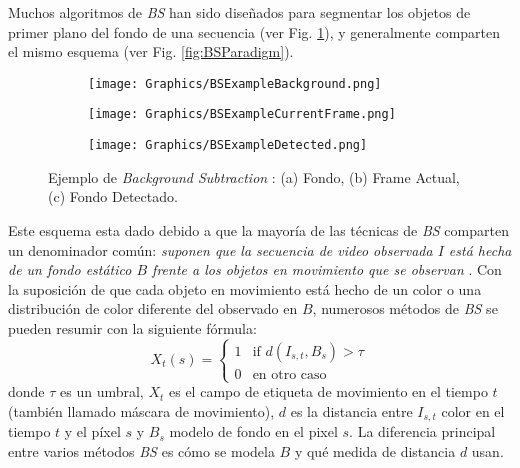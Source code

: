 Muchos algoritmos de \textit{BS} han sido diseñados para segmentar los objetos de primer plano del fondo de una secuencia (ver Fig. \ref{fig:BSExample}), y generalmente comparten el mismo esquema (ver Fig. \ref{fig:BSParadigm}).

\begin{figure}[h!]
	\centering
	\begin{subfigure}[b]{0.32\linewidth}
		\centering
		\texttt{[image: Graphics/BSExampleBackground.png]}
		\caption{}
	\end{subfigure}
	\begin{subfigure}[b]{0.32\linewidth}
		\centering
		\texttt{[image: Graphics/BSExampleCurrentFrame.png]}
		\caption{}
	\end{subfigure}
	\begin{subfigure}[b]{0.32\linewidth}
		\centering
		\texttt{[image: Graphics/BSExampleDetected.png]}
		\caption{}
	\end{subfigure}
	\caption{Ejemplo de \textit{Background Subtraction} : (a) Fondo, (b) Frame Actual, (c) Fondo Detectado.}
	\label{fig:BSExample}
\end{figure}

Este esquema esta dado debido a que la mayoría de las técnicas de \textit{BS} comparten un denominador común: \textit{suponen que la secuencia de video observada $I$ está hecha de un fondo estático $B$ frente a los objetos en movimiento que se observan} \cite{YannickPierreMarcBrunoHeleneChristophe}. Con la suposición de que cada objeto en movimiento está hecho de un color o una distribución de color diferente del observado en $B$, numerosos métodos de \textit{BS} se pueden resumir con la siguiente fórmula:
\begin{equation}
X_t(s) = \left\{
\begin{array}{ll}
	1 & \mbox{if } d(I_{s,t}, B_s) > \tau \\
	0               & \mbox{en otro caso}        
\end{array}
\right.
\label{eq:BSFormula}
\end{equation}
donde $\tau$ es un umbral, $X_t$ es el campo de etiqueta de movimiento en el tiempo $t$ (también llamado máscara de movimiento), $d$ es la distancia entre $I_{s,t}$ color en el tiempo $t$ y el píxel $s$ y $B_s$ modelo de fondo en el pixel $s$. La diferencia principal entre varios métodos \textit{BS} es cómo se modela $B$ y qué medida de distancia $d$ usan.\\

